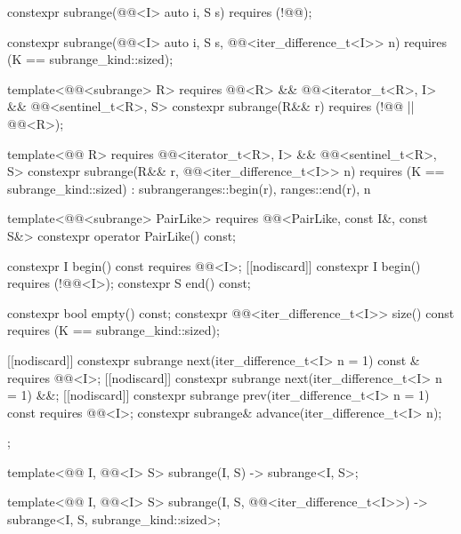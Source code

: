 \begin{codeblock}
{{    constexpr subrange(@@<I> auto i, S s) requires (!@@);

    constexpr subrange(@@<I> auto i, S s,
                       @@<iter_difference_t<I>> n)
      requires (K == subrange_kind::sized);

    template<@@<subrange> R>
      requires @@<R> &&
               @@<iterator_t<R>, I> &&
               @@<sentinel_t<R>, S>
    constexpr subrange(R&& r) requires (!@@ || @@<R>);

    template<@@ R>
      requires @@<iterator_t<R>, I> &&
               @@<sentinel_t<R>, S>
    constexpr subrange(R&& r, @@<iter_difference_t<I>> n)
      requires (K == subrange_kind::sized)
        : subrange{ranges::begin(r), ranges::end(r), n} {}

    template<@@<subrange> PairLike>
      requires @@<PairLike, const I&, const S&>
    constexpr operator PairLike() const;

    constexpr I begin() const requires @@<I>;
    [[nodiscard]] constexpr I begin() requires (!@@<I>);
    constexpr S end() const;

    constexpr bool empty() const;
    constexpr @@<iter_difference_t<I>> size() const
      requires (K == subrange_kind::sized);

    [[nodiscard]] constexpr subrange next(iter_difference_t<I> n = 1) const &
      requires @@<I>;
    [[nodiscard]] constexpr subrange next(iter_difference_t<I> n = 1) &&;
    [[nodiscard]] constexpr subrange prev(iter_difference_t<I> n = 1) const
      requires @@<I>;
    constexpr subrange& advance(iter_difference_t<I> n);
  };

  template<@@ I, @@<I> S>
    subrange(I, S) -> subrange<I, S>;

  template<@@ I, @@<I> S>
    subrange(I, S, @@<iter_difference_t<I>>) ->
      subrange<I, S, subrange_kind::sized>;

}
\end{codeblock}
